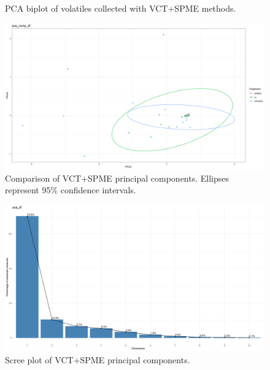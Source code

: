 \documentclass[12pt,final,CPage]{ufthesis}
\begin{document}
{\begin{figure}
{  }

  \caption[PCA biplot of volatiles collected with VCT+SPME methods]{PCA biplot of volatiles collected with VCT+SPME methods.}\label{fig:all-vocs}
  \end{figure}
  \begin{figure}

  {\centering \includegraphics[width=1\linewidth]{figure/rrv_volatiles_comparison_pca_comp_df} 

  }

  \caption[Comparison of VCT+SPME principal components]{Comparison of VCT+SPME principal components. Ellipses represent 95\% confidence intervals.}\label{fig:all-vocs-compares}
  \end{figure}
  \begin{figure}

  {\centering \includegraphics[width=1\linewidth]{figure/rrv_volatiles_screeplot_pca_df} 

  }

  \caption[Scree plot of VCT+SPME principal components]{Scree plot of VCT+SPME principal components.}\label{fig:all-vocs-scree}
  \end{figure}
  \begin{figure}


\end{figure}}
\end{document}

